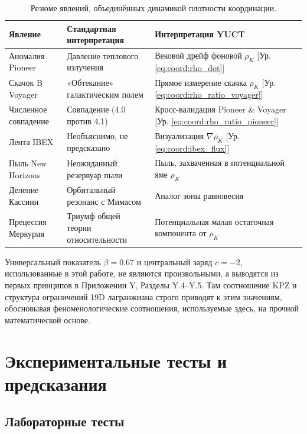 \documentclass[12pt,a4paper]{article}
\theoremstyle{remark}
\begin{document}
	\begin{table}[htbp]
		\centering
		\caption{Резюме явлений, объединённых динамикой плотности координации.}
		\label{tab:coord:summary}
		\begin{tabular}{|p{4.5cm}|p{4.5cm}|p{5cm}|}
			\hline
			\textbf{Явление} & \textbf{Стандартная интерпретация} & \textbf{Интерпретация YUCT} \\
			\hline
			Аномалия Pioneer & Давление теплового излучения & Вековой дрейф фоновой $\rho_K$ [Ур. \ref{eq:coord:rho_dot}] \\
			\hline
			Скачок B Voyager & «Обтекание» галактическим полем & Прямое измерение скачка $\rho_K$ [Ур. \ref{eq:coord:rho_ratio_voyager}] \\
			\hline
			Численное совпадение & Совпадение (4.0 против 4.1) & Кросс-валидация Pioneer \& Voyager [Ур. \ref{eq:coord:rho_ratio_pioneer}] \\
			\hline
			Лента IBEX & Необъяснимо, не предсказано & Визуализация $\nabla \rho_K$ [Ур. \ref{eq:coord:ibex_flux}] \\
			\hline
			Пыль New Horizons & Неожиданный резервуар пыли & Пыль, захваченная в потенциальной яме $\rho_K$ \\
			\hline
			Деление Кассини & Орбитальный резонанс с Мимасом & Аналог зоны равновесия \\
			\hline
			Прецессия Меркурия & Триумф общей теории относительности & Потенциальная малая остаточная компонента от $\rho_K$ \\
			\hline
		\end{tabular}
	\end{table}
	
	Универсальный показатель $\beta = 0.67$ и центральный заряд $c = -2$, использованные в этой работе, не являются произвольными, а выводятся из первых принципов в Приложении Y, Разделы Y.4–Y.5. Там соотношение KPZ и структура ограничений 19D лагранжиана строго приводят к этим значениям, обосновывая феноменологические соотношения, используемые здесь, на прочной математической основе.
	
	\section{Экспериментальные тесты и предсказания}
	\label{sec:experimental-tests}
	
	\subsection{Лабораторные тесты}
	
\end{document}
